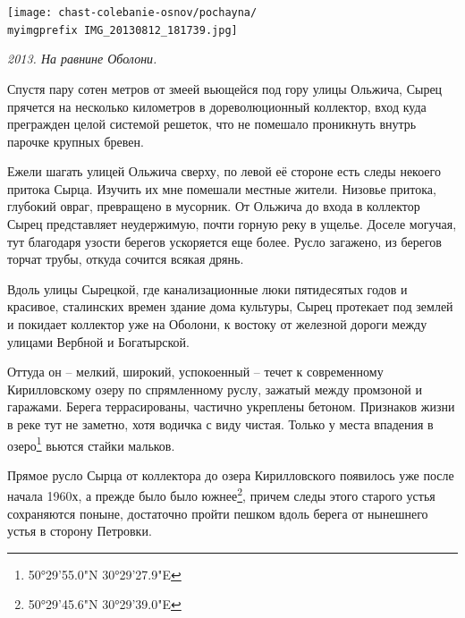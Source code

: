 \begin{center}
\texttt{[image: chast-colebanie-osnov/pochayna/\\myimgprefix IMG\_20130812\_181739.jpg]}

\textit{2013. На равнине Оболони.}
\end{center}

\newpage

Спустя пару сотен метров от змеей вьющейся под гору улицы Ольжича, Сырец прячется на несколько километров в дореволюционный коллектор, вход куда прегражден целой системой решеток, что не помешало проникнуть внутрь парочке крупных бревен.

Ежели шагать улицей Ольжича сверху, по левой её стороне есть следы некоего притока Сырца. Изучить их мне помешали местные жители. Низовье притока, глубокий овраг, превращено в мусорник. От Ольжича до входа в коллектор Сырец представляет неудержимую, почти горную реку в ущелье. Доселе могучая, тут благодаря узости берегов ускоряется еще более. Русло загажено, из берегов торчат трубы, откуда сочится всякая дрянь. 

Вдоль улицы Сырецкой, где канализационные люки пятидесятых годов и красивое, сталинских времен здание дома культуры, Сырец протекает под землей и покидает коллектор уже на Оболони, к востоку от железной дороги между улицами Вербной и Богатырской. 

Оттуда он – мелкий, широкий, успокоенный – течет к современному Кирилловскому озеру по спрямленному руслу, зажатый между промзоной и гаражами. Берега террасированы, частично укреплены бетоном. Признаков жизни в реке тут не заметно, хотя водичка с виду чистая. Только у места впадения в озеро\footnote{50°29'55.0"N 30°29'27.9"E} вьются стайки мальков.

Прямое русло Сырца от коллектора до озера Кирилловского появилось уже после начала 1960х, а прежде было было южнее\footnote{50°29'45.6"N 30°29'39.0"E}, причем следы этого старого устья сохраняются поныне, достаточно пройти пешком вдоль берега от нынешнего устья в сторону Петровки.




